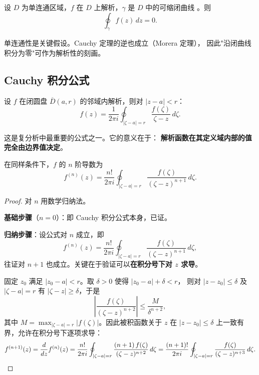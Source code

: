 \begin{theorem}
设 $D$ 为单连通区域，$f$ 在 $D$ 上解析，$\gamma$ 是 $D$ 中的可缩闭曲线
。则
\[
  \oint_\gamma f(z)\,dz = 0.
\]
\end{theorem}

\begin{remark}
单连通性是关键假设。Cauchy 定理的逆也成立（Morera 定理），
因此"沿闭曲线积分为零"可作为解析性的刻画。
\end{remark}

\subsection{Cauchy 积分公式}

\begin{theorem}
设 $f$ 在闭圆盘 $\overline{D}(a,r)$ 的邻域内解析，则对 $|z-a| < r$：
\[
  f(z) = \frac{1}{2\pi i}\oint_{|\zeta - a| = r} \frac{f(\zeta)}{\zeta - z}\,d\zeta.
\]
\end{theorem}

这是复分析中最重要的公式之一。它的意义在于：
\textbf{解析函数在其定义域内部的值完全由边界值决定}。

\begin{theorem}
在同样条件下，$f$ 的 $n$ 阶导数为
\[
  f^{(n)}(z) = \frac{n!}{2\pi i}\oint_{|\zeta - a| = r}
  \frac{f(\zeta)}{(\zeta - z)^{n+1}}\,d\zeta.
\]
\end{theorem}

\begin{proof}
对 $n$ 用数学归纳法。

\textbf{基础步骤}（$n=0$）：即 Cauchy 积分公式本身，已证。

\textbf{归纳步骤}：设公式对 $n$ 成立，即
\[
  f^{(n)}(z) = \frac{n!}{2\pi i}\oint_{|\zeta-a|=r}
  \frac{f(\zeta)}{(\zeta-z)^{n+1}}\,d\zeta,
\]
往证对 $n+1$ 也成立。关键在于验证可以\textbf{在积分号下对 $z$ 求导}。

固定 $z_0$ 满足 $|z_0 - a| < r$。取 $\delta > 0$ 使得 $|z_0 - a| + \delta < r$，
则对 $|z - z_0| \leq \delta$ 及 $|\zeta - a| = r$ 有 $|\zeta - z| \geq \delta$，于是
\[
  \left|\frac{f(\zeta)}{(\zeta-z)^{n+2}}\right|
  \leq \frac{M}{\delta^{n+2}},
\]
其中 $M = \max_{|\zeta-a|=r}|f(\zeta)|$。因此被积函数关于 $z$ 在 $|z-z_0| \leq \delta$
上一致有界，允许在积分号下逐项求导：
\[
  f^{(n+1)}(z) = \frac{d}{dz}f^{(n)}(z)
  = \frac{n!}{2\pi i}\oint_{|\zeta-a|=r}
    \frac{(n+1)\,f(\zeta)}{(\zeta-z)^{n+2}}\,d\zeta
  = \frac{(n+1)!}{2\pi i}\oint_{|\zeta-a|=r}
    \frac{f(\zeta)}{(\zeta-z)^{n+3}}\,d\zeta.
  \qedhere
\]
\end{proof}

